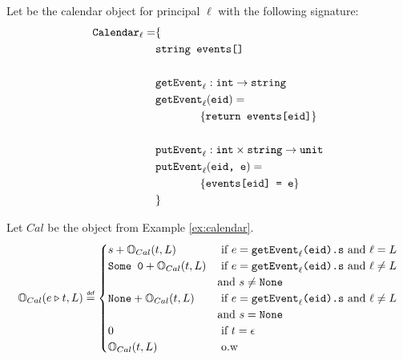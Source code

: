 \documentclass[acmsmall,screen,review, nonacm]{acmart}
\begin{document}
\begin{example} \label{ex:calendar}
  Let  be the calendar object for principal $\ell$  with the following signature:
  \begin{align*}
    \texttt{Calendar}_{\ell} = & \{ \\
    & \texttt{string} \texttt{ events[]} \\
    \\
    & \texttt{getEvent}_{\ell}: \texttt{int} \to \texttt{string} \\
    & \texttt{getEvent}_{\ell} (\texttt{eid}) =  \\
    & \qquad \qquad \{ \texttt{return events[eid]} \}\\
    \\
    & \texttt{putEvent}_{\ell}: \texttt{int} \times \texttt{string} \to  \texttt{unit}\\
    & \texttt{putEvent}_{\ell} (\texttt{eid, e}) =  \\
    & \qquad \qquad \{ \texttt{events[eid] = e} \} \\
    &\}
  \end{align*}
\end{example}


\begin{example}  \label{ex4}
  Let $\mathit{Cal}$ be the  object from Example \ref{ex:calendar}.
  \[
  \ob{e \tracecat t }{Cal}{L} \isdef \begin{cases}
    s + \ob{t}{Cal}{L}  & \mbox{ if } e = {\mycode{getEvent}_{\ell}\mycode{(eid).s}} \text{ and } \ell = L \\
    \mycode{Some 0} + \ob{t}{Cal}{L}  & \mbox{ if } e = {\mycode{getEvent}_{\ell}\mycode{(eid).s}} \text{ and } \ell \ne L \\
    & \text{and } s \ne \mycode{None} \\
    \mycode{None} + \ob{t}{Cal}{L} & \mbox{ if } e = {\mycode{getEvent}_{\ell}\mycode{(eid).s}} \text{ and } \ell \ne L \\
    &  \text{and } s = \mycode{None} \\
    0 & \mbox{ if } t = \epsilon \\
    \ob{t}{Cal}{L} & \mbox{ o.w } 
  \end{cases}
  \]
\end{example}
\end{document}
